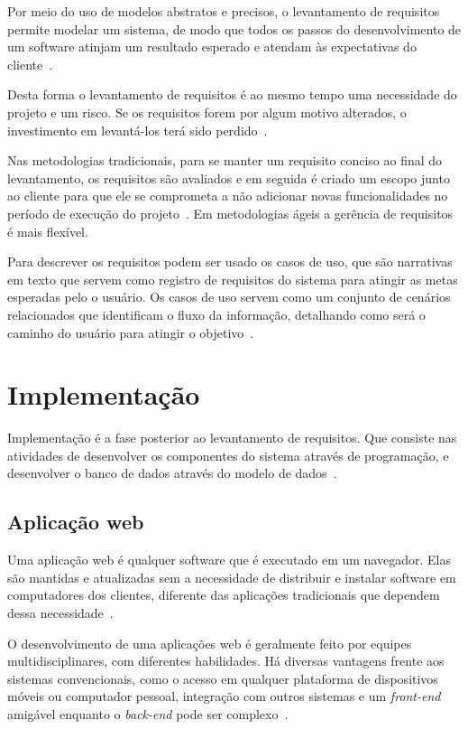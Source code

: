 Por meio do uso de modelos abstratos e precisos, o levantamento de requisitos permite modelar um sistema, de modo que todos os passos do desenvolvimento de um software atinjam um resultado esperado e atendam às expectativas do cliente~\cite{pressman2016engenharia}.

Desta forma o levantamento de requisitos é ao mesmo tempo uma necessidade do projeto e um risco.
Se os requisitos forem por algum motivo alterados, o investimento em levantá-los terá sido perdido~\cite{schimiguel2017tecnicas}.

Nas metodologias tradicionais, para se manter um requisito conciso ao final do levantamento, os requisitos são avaliados e em seguida é criado um escopo junto ao cliente para que ele se comprometa a não adicionar novas funcionalidades no período de execução do projeto~\cite{lutz2018implantaccao}.
Em metodologias ágeis a gerência de requisitos é mais flexível.


Para descrever os requisitos podem ser usado os casos de uso, que são narrativas em texto que servem como registro de requisitos do sistema para atingir as metas esperadas pelo o usuário.
Os casos de uso servem como um conjunto de cenários relacionados que identificam o fluxo da informação, detalhando como será o caminho do usuário para atingir o objetivo~\cite{larman2002utilizando}.

\section{Implementação}

Implementação é a fase posterior ao levantamento de requisitos.
Que consiste nas atividades de desenvolver os componentes do sistema através de programação, e desenvolver o banco de dados através do modelo de dados~\cite{azevedo2008definiccao}.

\subsection{Aplicação web}

Uma aplicação web é qualquer software que é executado em um navegador.
Elas são mantidas e atualizadas sem a necessidade de distribuir e instalar software em computadores dos clientes, diferente das aplicações tradicionais que dependem dessa necessidade~\cite{sampaio2004xwebprocess}.

O desenvolvimento de uma aplicações web é geralmente feito por equipes multidisciplinares, com diferentes habilidades.
Há diversas vantagens frente aos sistemas convencionais, como o acesso em qualquer plataforma de dispositivos móveis ou computador pessoal, integração com outros sistemas e um \textit{front-end} amigável enquanto o \textit{back-end} pode ser complexo~\cite{ferreira2015arquitetutura}. 

